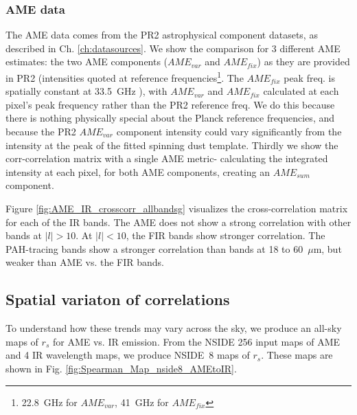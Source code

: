     \subsubsection{AME data}
       The AME data comes from the PR2 astrophysical component datasets, as described in Ch. \ref{ch:datasources}. We show the comparison for 3 different AME estimates: the two AME components ($AME_{var}$ and $AME_{fix}$) as they are provided in PR2 (intensities quoted at reference frequencies\footnote{22.8~GHz for $AME_{var}$, 41~GHz for $AME_{fix}$}. The  $AME_{fix}$ peak freq. is spatially constant at 33.5~GHz ), with $AME_{var}$ and $AME_{fix}$ calculated at each pixel's peak frequency rather than the PR2 reference freq. We do this because there is nothing physically special about the Planck reference frequencies, and because the PR2 $AME_{var}$ component intensity could vary significantly from the intensity at the peak of the fitted spinning dust template. Thirdly we show the corr-correlation matrix with a single AME metric- calculating the integrated intensity at each pixel, for both AME components, creating an $AME_{sum}$ component.



     Figure \ref{fig:AME_IR_crosscorr_allbandsg} visualizes the cross-correlation matrix for each of the IR bands. The AME does not show a strong correlation with other bands at $|l|>10$. At $|l|<10$, the FIR bands show stronger correlation. The PAH-tracing bands show a stronger correlation than bands at 18 to 60~$\mu$m, but weaker than AME vs. the FIR bands.

  \subsection{Spatial variaton of correlations}
    To understand how these trends may vary across the sky, we produce an all-sky maps of $r_{s}$ for AME vs. IR emission. From the NSIDE 256 input maps of AME and 4 IR wavelength maps, we produce NSIDE~8 maps of $r_{s}$. These maps are shown in Fig. \hyperref[fig:Spearman_Map_nside8_AMEtoIR]{\ref*{fig:Spearman_Map_nside8_AMEtoIR}}.

